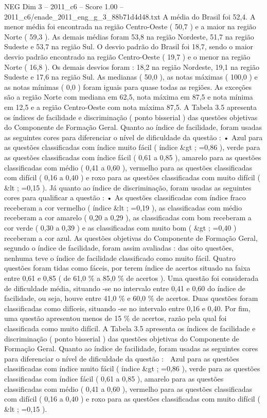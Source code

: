 \begin{textsample}{NEG Dim 3 – 2011\_c6 – Score 1.00 – 2011\_c6/enade\_2011\_eng\_g\_3\_88b71d4d48.txt}
A média do Brasil foi 52,4.
A menor média foi encontrada na região Centro-Oeste ( 50,7 ) e a maior na região Norte ( 59,3 ).
As demais médias foram 53,8 na região Nordeste, 51,7 na região Sudeste e 53,7 na região Sul.
O desvio padrão do Brasil foi 18,7, sendo o maior desvio padrão encontrado na região Centro-Oeste ( 19,7 ) e o menor na região Norte ( 16,8 ).
Os demais desvios foram : 18,2 na região Nordeste, 19,1 na região Sudeste e 17,6 na região Sul.
As medianas ( 50,0 ), as notas máximas ( 100,0 ) e as notas mínimas ( 0,0 ) foram iguais para quase todas as regiões.
As exceções são a região Norte com mediana em 62,5, nota máxima em 87,5 e nota mínima em 12,5 e a região Centro-Oeste com nota máxima 87,5.
A Tabela 3.5 apresenta os índices de facilidade e discriminação ( ponto bisserial ) das questões objetivas do Componente de Formação Geral.
Quanto ao índice de facilidade, foram usadas as seguintes cores para diferenciar o nível de dificuldade da questão : • Azul para as questões classificadas com índice muito fácil ( índice \&gt ; =0,86 ), verde para as questões classificadas com índice fácil ( 0,61 a 0,85 ), amarelo para as questões classificadas com médio ( 0,41 a 0,60 ), vermelho para as questões classificadas com difícil ( 0,16 a 0,40 ) e roxo para as questões classificadas com muito difícil ( \&lt ; =0,15 ).
Já quanto ao índice de discriminação, foram usadas as seguintes cores para qualificar a questão : • As questões classificadas com índice fraco receberam a cor vermelho ( índice \&lt ; =0,19 ), as classificadas com médio receberam a cor amarelo ( 0,20 a 0,29 ), as classificadas com bom receberam a cor verde ( 0,30 a 0,39 ) e as classificadas com muito bom ( \&gt ; =0,40 ) receberam a cor azul.
As questões objetivas do Componente de Formação Geral, segundo o índice de facilidade, foram assim avaliadas : das oito questões, nenhuma teve o índice de facilidade classificado como muito fácil.
Quatro questões foram tidas como fáceis, por terem índice de acertos situado na faixa entre 0,61 e 0,85 ( de 61,0 \% a 85,0 \% de acertos ).
Uma questão foi considerada de dificuldade média, situando -se no intervalo entre 0,41 e 0,60 do índice de facilidade, ou seja, houve entre 41,0 \% e 60,0 \% de acertos.
Duas questões foram classificadas como difíceis, situando -se no intervalo entre 0,16 e 0,40.
Por fim, uma questão apresentou menos de 15 \% de acertos, razão pela qual foi classificada como muito difícil.
A Tabela 3.5 apresenta os índices de facilidade e discriminação ( ponto bisserial ) das questões objetivas do Componente de Formação Geral.
Quanto ao índice de facilidade, foram usadas as seguintes cores para diferenciar o nível de dificuldade da questão :  Azul para as questões classificadas com índice muito fácil ( índice \&gt ; =0,86 ), verde para as questões classificadas com índice fácil ( 0,61 a 0,85 ), amarelo para as questões classificadas com médio ( 0,41 a 0,60 ), vermelho para as questões classificadas com difícil ( 0,16 a 0,40 ) e roxo para as questões classificadas com muito difícil ( \&lt ; =0,15 ).

\end{textsample}
